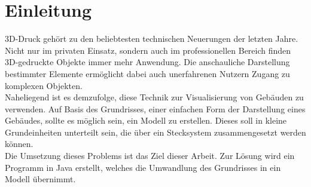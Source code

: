 \chapter{Einleitung}
3D-Druck gehört zu den beliebtesten technischen Neuerungen der letzten Jahre.
Nicht nur im privaten Einsatz, sondern auch im professionellen Bereich finden 3D-gedruckte Objekte immer mehr Anwendung.
Die anschauliche Darstellung bestimmter Elemente ermöglicht dabei auch unerfahrenen Nutzern Zugang zu komplexen Objekten. \\
Naheliegend ist es demzufolge, diese Technik zur Visualisierung von Gebäuden zu verwenden.
Auf Basis des Grundrisses, einer einfachen Form der Darstellung eines Gebäudes, sollte es möglich sein, ein Modell zu erstellen.
Dieses soll in kleine Grundeinheiten unterteilt sein, die über ein Stecksystem zusammengesetzt werden können. \\
Die Umsetzung dieses Problems ist das Ziel dieser Arbeit.
Zur Lösung wird ein Programm in Java erstellt, welches die Umwandlung des Grundrisses in ein Modell übernimmt.

%
%
%

